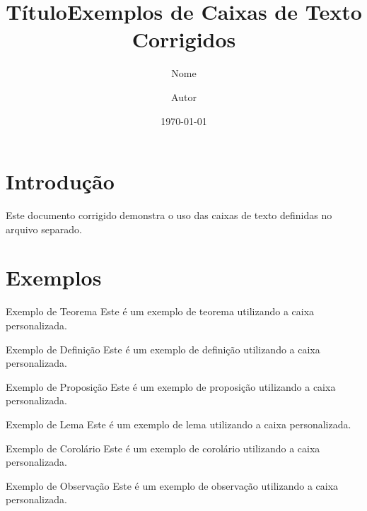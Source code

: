 \documentclass[12pt]{article}
\title{Título}
\author{Nome}
\begin{document}
\title{Exemplos de Caixas de Texto Corrigidos}
\author{Autor}
\date{\today}
\maketitle

\section{Introdução}
Este documento corrigido demonstra o uso das caixas de texto definidas no arquivo separado.

\section{Exemplos}

\begin{CaixaTeo}{Exemplo de Teorema}
    Este é um exemplo de teorema utilizando a caixa personalizada.
\end{CaixaTeo}

\begin{CaixaDef}{Exemplo de Definição}
    Este é um exemplo de definição utilizando a caixa personalizada.
\end{CaixaDef}

\begin{CaixaProp}{Exemplo de Proposição}
    Este é um exemplo de proposição utilizando a caixa personalizada.
\end{CaixaProp}

\begin{CaixaLema}{Exemplo de Lema}
    Este é um exemplo de lema utilizando a caixa personalizada.
\end{CaixaLema}

\begin{CaixaCoro}{Exemplo de Corolário}
    Este é um exemplo de corolário utilizando a caixa personalizada.
\end{CaixaCoro}

\begin{CaixaObs}{Exemplo de Observação}
    Este é um exemplo de observação utilizando a caixa personalizada.
\end{CaixaObs}
\end{document}
